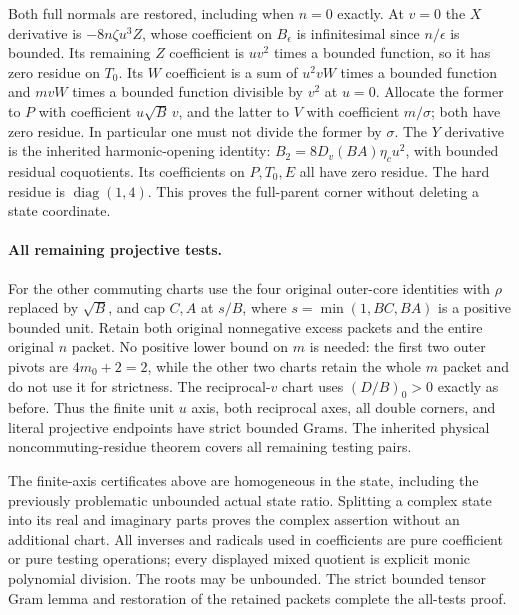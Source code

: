 Both full normals are restored, including when $n=0$ exactly.
At $v=0$ the $X$ derivative is $-8n\zeta u^3Z$, whose coefficient
on $B_\epsilon$ is infinitesimal since $n/\epsilon$ is bounded.
Its remaining $Z$ coefficient is $uv^2$ times a bounded function,
so it has zero residue on $T_0$.  Its $W$ coefficient is a sum of
$u^2vW$ times a bounded function and $mvW$ times a bounded
function divisible by $v^2$ at $u=0$.  Allocate the former to
$P$ with coefficient $u\sqrt B\,v$, and the latter to $V$ with
coefficient $m/\sigma$; both have zero residue.  In particular one
must not divide the former by $\sigma$.
The $Y$ derivative is the inherited harmonic-opening identity:
$B_2=8D_v(BA)\eta_cu^2$, with bounded residual coquotients.
Its coefficients on $P,T_0,E$ all have zero residue.  The hard
residue is $\operatorname{diag}(1,4)$.  This proves the full-parent
corner without deleting a state coordinate.

\paragraph{All remaining projective tests.}
For the other commuting charts use the four original outer-core
identities with $\rho$ replaced by $\sqrt B$, and cap $C,A$ at
$s/B$, where $s=\min(1,BC,BA)$ is a positive bounded unit.
Retain both original nonnegative excess packets and the entire
original $n$ packet.  No positive lower bound on $m$ is needed:
the first two outer pivots are $4m_0+2=2$, while the other two
charts retain the whole $m$ packet and do not use it for strictness.
The reciprocal-$v$ chart uses $(D/B)_0>0$ exactly as before.
Thus the finite unit $u$ axis, both reciprocal axes, all double
corners, and literal projective endpoints have strict bounded
Grams.  The inherited physical noncommuting-residue theorem covers
all remaining testing pairs.

The finite-axis certificates above are homogeneous in the state,
including the previously problematic unbounded actual state
ratio.  Splitting a complex state into its real and imaginary
parts proves the complex assertion without an additional chart.
All inverses and radicals used in coefficients are pure coefficient
or pure testing operations; every displayed mixed quotient is
explicit monic polynomial division.  The roots may be unbounded.
The strict bounded tensor Gram lemma and restoration of the retained
packets complete the all-tests proof.
